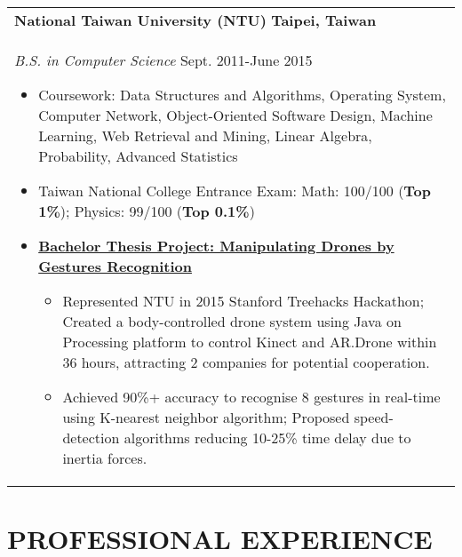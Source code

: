 \documentclass[a4paper,10pt]{article} %
\begin{document}
{\begin{tabular}{p{18.5cm}}
{\fontsize{11}{13.2}\textbf{National Taiwan University (NTU)}} \hfill \textbf{Taipei, Taiwan}\\
{\it B.S. in Computer Science} \hfill Sept. 2011-June 2015
\begin{itemize}
\item Coursework: Data Structures and Algorithms, Operating System, Computer Network, Object-Oriented Software Design, Machine Learning, Web Retrieval and Mining, Linear Algebra, Probability, Advanced Statistics 
\item Taiwan National College Entrance Exam:  Math: 100/100 (\textbf{Top 1\%}); Physics: 99/100 (\textbf{Top 0.1\%})
\item \textbf{\href{https://www.youtube.com/watch?v=jxsZaQ6PcXU}{Bachelor Thesis Project: Manipulating Drones by Gestures Recognition}}
\begin{itemize}
	\item Represented NTU in 2015 Stanford Treehacks Hackathon; Created a body-controlled drone system using Java on Processing platform to control Kinect and AR.Drone within 36 hours, attracting 2 companies for potential cooperation. 
	\item Achieved 90\%+ accuracy to recognise 8 gestures in real-time using K-nearest neighbor algorithm; Proposed speed-detection algorithms reducing 10-25\% time delay due to inertia forces. \vspace*{-\baselineskip}
\end{itemize}
\end{itemize} 
\end{tabular}

\section{\textbf{PROFESSIONAL EXPERIENCE}}
\begin{tabular}{p{18.5cm}}


\end{tabular}}
\end{document}
